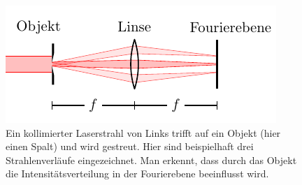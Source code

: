 \begin{figure}[h]
	\centering
	\includegraphics[scale=1]{graphs/theorie/ft-an-linse.pdf}
	\caption[Illustration: Fouriertransformation an einer Linse]{
		Ein kollimierter Laserstrahl von Links trifft auf ein Objekt (hier einen Spalt) und wird gestreut. Hier sind beispielhaft drei Strahlenverläufe eingezeichnet. Man erkennt, dass durch das Objekt die Intensitätsverteilung in der Fourierebene beeinflusst wird.
	} \label{fig:ft-an-linse}
\end{figure}